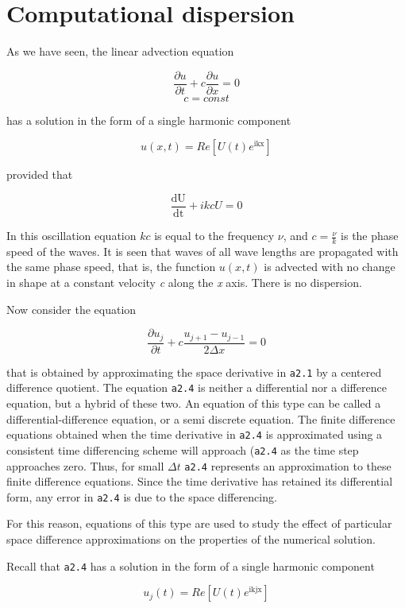 \section{Computational dispersion}\label{sec:computational-dispersion}

As we have seen, the linear advection equation

 \[\frac{\partial u}{\partial t} + c\frac{\partial u}{\partial x} = 0\]\[c = const\]

has a solution in the form of a single harmonic component

 \[u\left( x,t \right) = Re\left\lbrack U\left( t \right)e^{\text{ikx}} \right\rbrack\]

provided that

 \[\frac{\text{dU}}{\text{dt}} + ikcU = 0\]

In this oscillation equation \(kc\) is equal to the frequency \(\nu\),
and \(c = \frac{\nu}{k}\) is the phase speed of the waves. It is seen
that waves of all wave lengths are propagated with the same phase speed,
that is, the function \(u\left( x,t \right)\) is advected with no change
in shape at a constant velocity \emph{c} along the \emph{x} axis. There
is no dispersion.

Now consider the equation

 \[\frac{{\partial u}_{j}}{\partial t} + c\frac{u_{j + 1} - u_{j - 1}}{2\Delta x} = 0\]

that is obtained by approximating the space derivative in \texttt{a2.1}
by a centered difference quotient. The equation \texttt{a2.4} is neither
a differential nor a difference equation, but a hybrid of these two. An
equation of this type can be called a differential-difference equation,
or a semi discrete equation. The finite difference equations obtained
when the time derivative in \texttt{a2.4} is approximated using a
consistent time differencing scheme will approach (\texttt{a2.4} as the
time step approaches zero. Thus, for small \(\Delta t\) \texttt{a2.4}
represents an approximation to these finite difference equations. Since
the time derivative has retained its differential form, any error in
\texttt{a2.4} is due to the space differencing.

For this reason, equations of this type are used to study the effect of
particular space difference approximations on the properties of the
numerical solution.

Recall that \texttt{a2.4} has a solution in the form of a single
harmonic component

 \[u_{j}\left( t \right) = Re\left\lbrack U\left( t \right)e^{\text{ikjx}} \right\rbrack\]

